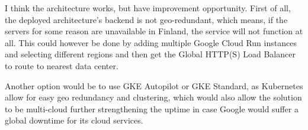\documentclass[11pt]{article}
\begin{document}
I think the architecture works, but have improvement opportunity. First of all, the deployed architecture's backend is not geo-redundant, which means, if the servers for some reason are unavailable in Finland, the service will not function at all. This could however be done by adding multiple Google Cloud Run instances and selecting different regions and then get the Global HTTP(S) Load Balancer to route to nearest data center.

Another option would be to use GKE Autopilot or GKE Standard, as Kubernetes allow for easy geo redundancy and clustering, which would also allow the solution to be multi-cloud further strengthening the uptime in case Google would suffer a global downtime for its cloud services.
\end{document}
